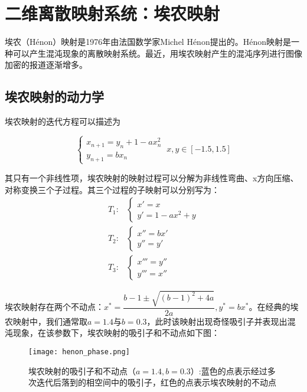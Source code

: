 \section{二维离散映射系统：埃农映射}
埃农（H\'{e}non）映射\cite{henon1976two}是1976年由法国数学家Michel H\'{e}non提出的。H\'{e}non映射是一种可以产生混沌现象的离散映射系统。最近，用埃农映射产生的混沌序列进行图像加密的报道逐渐增多。
\subsection{埃农映射的动力学}

埃农映射的迭代方程可以描述为

\begin{equation}
    \begin{cases}
        x_{n+1}=y_n+1-ax_n^2\\
        y_{n+1}=bx_n
    \end{cases}\ x,y\in [-1.5,1.5]
\end{equation}

其只有一个非线性项，埃农映射的映射过程可以分解为非线性弯曲、x方向压缩、对称变换三个子过程。其三个过程的子映射可以分别写为：
\begin{equation}
    \begin{aligned}
        T_1: & \begin{cases}
            x'=x\\
            y'=1-ax^2+y
        \end{cases}\\
        T_2: & \begin{cases}
            x''=bx'\\
            y''=y'
        \end{cases}\\
        T_3: & \begin{cases}
            x'''=y''\\
            y'''=x''
        \end{cases}
    \end{aligned}
\end{equation}

埃农映射存在两个不动点：$x^*=\dfrac{b-1\pm\sqrt{(b-1)^2+4a}}{2a},y^*=bx^*$。在经典的埃农映射中，我们通常取$a=1.4$与$b=0.3$，此时该映射出现奇怪吸引子并表现出混沌现象，在该参数下，埃农映射的吸引子和不动点如下图：
\begin{figure}
	\centering
	\texttt{[image: henon\_phase.png]}
    \caption[埃农映射的吸引子和不动点]{埃农映射的吸引子和不动点（$a=1.4,b=0.3$）:蓝色的点表示经过多次迭代后落到的相空间中的吸引子，红色的点表示埃农映射的不动点}
    \label{fig:logi_lypn}
\end{figure}

